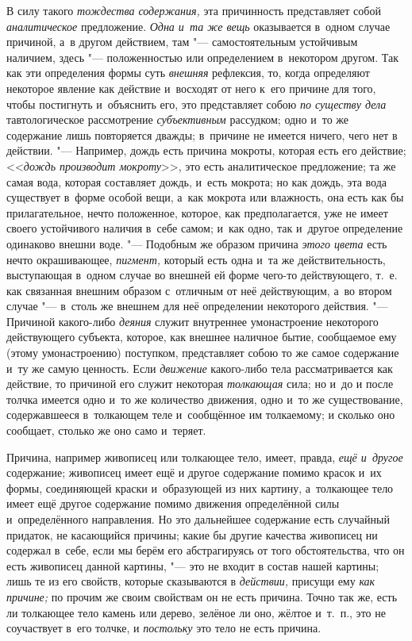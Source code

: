 В силу такого {\em тождества содержания,} эта причинность представляет собой
{\em аналитическое} предложение. {\em Одна и~та же вещь} оказывается в~одном
случае причиной, а~в другом действием, там "--- самостоятельным устойчивым
наличием, здесь "--- положенностью или определением в~некотором другом. Так как
эти определения формы суть {\em внешняя} рефлексия, то, когда определяют
некоторое явление как действие и~восходят от него к~его причине для того, чтобы
постигнуть и~объяснить его, это представляет собою {\em по существу дела}
тавтологическое рассмотрение {\em субъективным} рассудком; одно и~то же
содержание лишь повторяется дважды; в~причине не имеется ничего, чего нет в
действии. "--- Например, дождь есть причина мокроты, которая есть его действие;
<<{\em дождь производит мокроту}>>, это есть аналитическое предложение; та же
самая вода, которая составляет дождь, и~есть мокрота; но как дождь, эта вода
существует в~форме особой вещи, а~как мокрота или влажность, она есть как бы
прилагательное, нечто положенное, которое, как предполагается, уже не имеет
своего устойчивого наличия в~себе самом; и~как одно, так и~другое определение
одинаково внешни воде. "--- Подобным же образом причина {\em этого цвета} есть
нечто окрашивающее, {\em пигмент,} который есть одна и~та же действительность,
выступающая в~одном случае во внешней ей форме чего-то действующего, т.~е. как
связанная внешним образом с~отличным от неё действующим, а~во втором случае
"--- в~столь же внешнем для неё определении некоторого действия. "--- Причиной
какого-либо {\em деяния} служит внутреннее умонастроение некоторого
действующего субъекта, которое, как внешнее наличное бытие, сообщаемое ему
(этому умонастроению) поступком, представляет собою то же самое содержание и~ту
же самую ценность. Если {\em движение} какого-либо тела рассматривается как
действие, то причиной его служит некоторая {\em толкающая} сила; но и~до и
после толчка имеется одно и~то же количество движения, одно и~то же
существование, содержавшееся в~толкающем теле и~сообщённое им толкаемому; и
сколько оно сообщает, столько же оно само и~теряет.

Причина, например живописец или толкающее тело, имеет, правда,
{\em ещё и~другое} содержание; живописец имеет ещё и
другое содержание помимо красок и~их формы, соединяющей краски и~образующей
из них картину, а~толкающее тело имеет ещё другое содержание помимо
движения определённой силы и~определённого направления. Но это дальнейшее
содержание есть случайный придаток, не касающийся причины; какие бы другие
качества живописец ни содержал в~себе, если мы берём его абстрагируясь от
того обстоятельства, что он есть живописец данной картины, "--- это не входит
в состав нашей картины; лишь те из его свойств, которые сказываются в
{\em действии,} присущи ему {\em как причине;} по прочим же своим свойствам
он не есть причина. Точно так же, есть ли толкающее тело камень или дерево,
зелёное ли оно, жёлтое и~т.~п., это не соучаствует в~его толчке, и
{\em постольку} это тело не есть причина.

